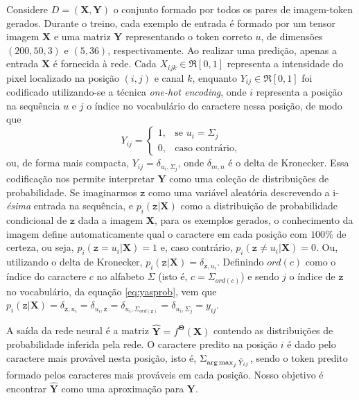 Considere $D = {(\mathbf{X}, \mathbf{Y})}$ o conjunto formado por todos os pares de imagem-token gerados. Durante o treino, cada exemplo de entrada é formado por um tensor imagem $\mathbf{X}$ e uma matriz $\mathbf{Y}$ representando o token correto $u$, de dimensões $(200, 50, 3)$ e $(5, 36)$, respectivamente. Ao realizar uma predição, apenas a entrada $\mathbf{X}$ é fornecida à rede. Cada $X_{ijk} \in \Re[0,1]$ representa a intensidade do pixel localizado na posição $(i,j)$ e canal $k$, enquanto $Y_{ij} \in \Re[0,1]$ foi codificado utilizando-se a técnica \textit{one-hot encoding}, onde $i$ representa a posição na sequência $u$ e $j$ o índice no vocabulário do caractere nessa posição, de modo que 
\begin{equation}\label{eq:yasprob}
   Y_{ij}= 
	\begin{cases}
		1,	& \text{se } u_i = \Sigma_j\\
		0,  & \text{caso contrário,}
	\end{cases}
\end{equation}
ou, de forma mais compacta, $Y_{ij} = \delta_{u_i,\Sigma_j}$, onde $\delta_{m,n}$ é o delta de Kronecker. Essa codificação nos permite interpretar $\mathbf{Y}$ como uma coleção de distribuições de probabilidade. Se imaginarmos $\mathtt{z}$ como uma variável aleatória descrevendo a i-\textit{ésima} entrada na sequência, e $p_i(\mathtt{z}|\mathbf{X})$ como a distribuição de probabilidade condicional de $\mathtt{z}$ dada a imagem $\mathbf{X}$, para os exemplos gerados, o conhecimento da imagem define automaticamente qual o caractere em cada posição com $100\%$ de certeza, ou seja, $p_i(\mathtt{z} = u_i|\mathbf{X}) = 1$ e, caso contrário, $p_i(\mathtt{z} \neq u_i|\mathbf{X}) = 0$. Ou, utilizando o delta de Kronecker, $p_i(\mathtt{z}|\mathbf{X}) = \delta_{\mathtt{z},u_i}$. Definindo $ord(c)$ como o índice do caractere $c$ no alfabeto $\Sigma$ (isto é, $c = \Sigma_{ord{(c)}}$) e sendo $j$ o índice de $\mathtt{z}$ no vocabulário, da equação \ref{eq:yasprob}, vem que $p_i(\mathtt{z}|\mathbf{X}) = \delta_{\mathtt{z},u_i} = \delta_{u_i, \mathtt{z}} = \delta_{u_i, \Sigma_{ord(\mathtt{z})}} = \delta_{u_i,\Sigma_j} = y_{ij}$.

A saída da rede neural é a matriz $\hat{\mathbf{Y}} = f^{\mathbf{\Theta}}(\mathbf{X})$ contendo as distribuições de probabilidade inferida pela rede. O caractere predito na posição $i$ é dado pelo caractere mais provável nesta posição, isto é, $\Sigma_{\operatorname*{arg\,max}_j \hat{Y}_{ij}}$, sendo o token predito formado pelos caracteres mais prováveis em cada posição. Nosso objetivo é encontrar $\hat{\mathbf{Y}}$ como uma aproximação para $\mathbf{Y}$.

